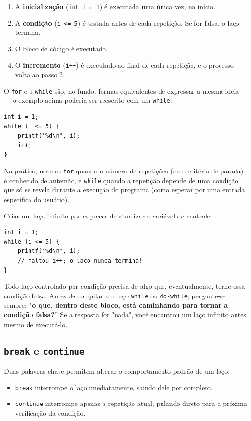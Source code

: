 \begin{enumerate}
    \item A \textbf{inicialização} (\texttt{int i = 1}) é executada uma única vez, no início.
    \item A \textbf{condição} (\texttt{i <= 5}) é testada antes de cada repetição. Se for falsa, o laço termina.
    \item O bloco de código é executado.
    \item O \textbf{incremento} (\texttt{i++}) é executado ao final de cada repetição, e o processo volta ao passo 2.
\end{enumerate}

O \texttt{for} e o \texttt{while} são, no fundo, formas equivalentes de expressar a mesma ideia — o exemplo acima poderia ser reescrito com um \texttt{while}:

\begin{lstlisting}
int i = 1;
while (i <= 5) {
    printf("%d\n", i);
    i++;
}
\end{lstlisting}

Na prática, usamos \texttt{for} quando o número de repetições (ou o critério de parada) é conhecido de antemão, e \texttt{while} quando a repetição depende de uma condição que só se revela durante a execução do programa (como esperar por uma entrada específica do usuário).

\begin{errocomum}
Criar um laço infinito por esquecer de atualizar a variável de controle:
\begin{lstlisting}
int i = 1;
while (i <= 5) {
    printf("%d\n", i);
    // faltou i++; o laco nunca termina!
}
\end{lstlisting}
Todo laço controlado por condição precisa de algo que, eventualmente, torne essa condição falsa. Antes de compilar um laço \texttt{while} ou \texttt{do-while}, pergunte-se sempre: \textbf{"o que, dentro deste bloco, está caminhando para tornar a condição falsa?"} Se a resposta for "nada", você encontrou um laço infinito antes mesmo de executá-lo.
\end{errocomum}

\subsection{\texttt{break} e \texttt{continue}}

Duas palavras-chave permitem alterar o comportamento padrão de um laço:

\begin{itemize}
    \item \texttt{break} interrompe o laço imediatamente, saindo dele por completo.
    \item \texttt{continue} interrompe apenas a repetição atual, pulando direto para a próxima verificação da condição.
\end{itemize}

